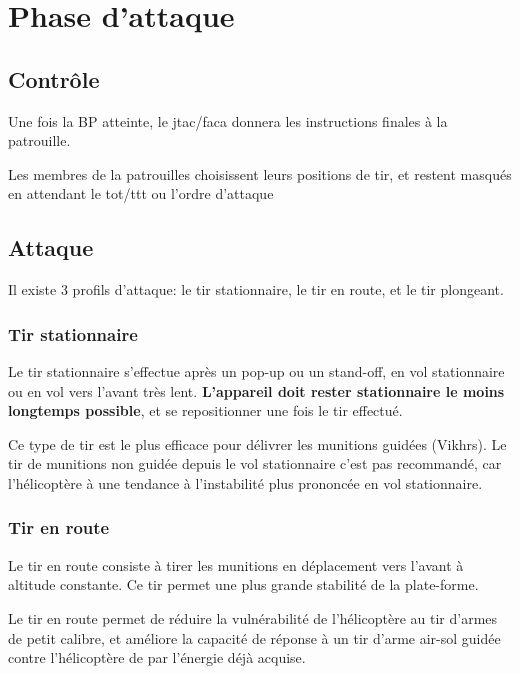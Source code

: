 \section{Phase d’attaque}

\subsection{Contrôle}

\e
    \item Une fois la BP atteinte, le \gls{jtac}/\gls{faca} donnera les instructions finales à la patrouille.
    \item Les membres de la patrouilles choisissent leurs positions de tir, et restent masqués en attendant le \gls{tot}/\gls{ttt} ou l’ordre d’attaque
\ed

\subsection{Attaque}

\e
    \item Il existe 3 profils d’attaque: le tir stationnaire, le tir en route, et le tir plongeant.
\ed

\subsubsection{Tir stationnaire}

\e
    \item
    Le tir stationnaire s’effectue après un pop-up ou un stand-off, en vol stationnaire ou en vol vers l'avant très lent. \textbf{L’appareil doit rester stationnaire le moins longtemps possible}, et se repositionner une fois le tir effectué.
    \item
    Ce type de tir est le plus efficace pour délivrer les munitions guidées (Vikhrs). Le tir de munitions non guidée depuis le vol stationnaire c’est pas recommandé, car l’hélicoptère à une tendance à l’instabilité plus prononcée en vol stationnaire.
\ed

\subsubsection{Tir en route}

\e
    \item Le tir en route consiste à tirer les munitions en déplacement vers l’avant à altitude constante. Ce tir permet une plus grande stabilité de la plate-forme.
    \item
    Le tir en route permet de réduire la vulnérabilité de l’hélicoptère au tir d’armes de petit calibre, et améliore la capacité de réponse à un tir d’arme air-sol guidée contre l’hélicoptère de par l’énergie déjà acquise.
\ed

